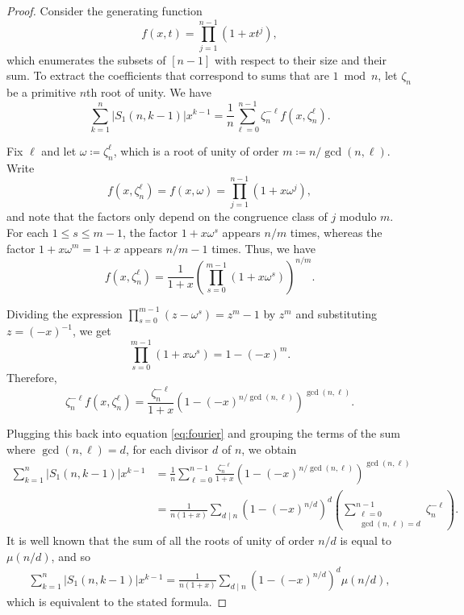 \documentclass[12pt]{article}
\newcommand{\card}[1]{\left|#1\right|}
\newcommand{\nroot}{\zeta_n} %
\theoremstyle{definition}
\begin{document}
\begin{proof}
Consider the generating function
\[    
    f(x,t) = \prod_{j = 1}^{n - 1} (1 + xt^j),
\]
which enumerates the subsets of $[n - 1]$ with respect to their size and their sum. To extract the coefficients that correspond to sums that are $1 \bmod n$, let $\nroot$ be a primitive $n$th root of unity. We have
\begin{equation}
    \label{eq:fourier}
   \sum_{k=1}^n\card{S_1(n,k-1)}x^{k-1}=
    \frac{1}{n} \sum_{\ell = 0}^{n - 1} \nroot^{-\ell} f(x,\nroot^\ell).
\end{equation}

    Fix $\ell$ and let $\omega\coloneqq\nroot^\ell$, which is a root
    of unity of order $m\coloneqq n / {\gcd(n, \ell)}$. Write 
    \begin{equation*}
        f(x,\nroot^\ell) = f(x,\omega)= \prod_{j = 1}^{n - 1} (1 + x \omega^j),
    \end{equation*}
    and note that the factors only depend on the congruence class of $j$ modulo $m$. For each $1\le s\le m-1$, the factor $1 + x \omega^s$ appears $n/m$ times, whereas the factor $1 + x \omega^m=1 + x$ appears $n/m-1$ times. Thus, we have
    \begin{equation*}
        f(x,\nroot^\ell)
        =
        \frac{1}{1 + x} \left(\prod_{s = 0}^{m-1} (1 + x \omega^s)\right)^{n/m}.
    \end{equation*}
    
    Dividing the expression $\prod_{s=0}^{m-1}(z-\omega^s)=z^m-1$ by $z^m$ and substituting $z=(-x)^{-1}$, we get 
    \begin{equation*}
        \prod_{s = 0}^{m-1} (1 + x \omega^s)
        =
        1 - (-x)^m.
    \end{equation*}
    Therefore,
    \begin{equation*}
        \nroot^{-\ell} f(x,\nroot^\ell)
        =
        \frac{\nroot^{-\ell}}{1+x} \left(1 - (-x)^{n / {\gcd(n,\ell)}}\right)^{\gcd(n,\ell)}.
    \end{equation*}
    
    Plugging this back into  equation \eqref{eq:fourier} and grouping the terms
    of the sum where $\gcd(n,\ell)=d$, for each divisor $d$ of $n$, we obtain
    \begin{align*}
        \sum_{k=1}^n\card{S_1(n,k-1)}x^{k-1} 
        & =\frac{1}{n} \sum_{\ell=0}^{n-1} \frac{\nroot^{-\ell}}{1 + x} \left(1 - (-x)^{n / \gcd(n,\ell)}\right)^{\gcd(n,\ell)}\\
        &=         \frac{1}{n(1 + x)} \sum_{d \mid n} \left(1 - (-x)^{n / d}\right)^d \left(\sum_{\substack{\ell=0\\ \gcd(n, \ell) = d}}^{n-1} \nroot^{-\ell} \right).
    \end{align*}
    It is well known that the sum of all the roots of unity of order $n / d$ is equal to $\mu(n/d)$, and so
    \begin{align*}
       \sum_{k=1}^n\card{S_1(n,k-1)}x^{k-1}
        = \frac{1}{n(1 + x)} \sum_{d \mid n} \left(1 - (-x)^{n / d}\right)^d \mu(n/d),
    \end{align*}
    which is equivalent to the stated formula.
\end{proof}
\end{document}

